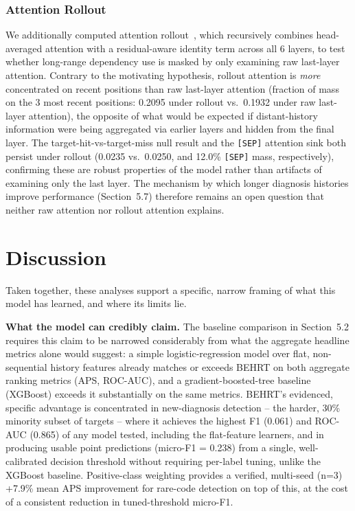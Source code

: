 \documentclass[11pt]{article}
\begin{document}
\subsubsection{Attention Rollout}

We additionally computed attention
rollout~\cite{abnar2020quantifying}, which recursively combines
head-averaged attention with a residual-aware identity term across all 6
layers, to test whether long-range dependency use is masked by only examining
raw last-layer attention. Contrary to the motivating hypothesis, rollout
attention is \emph{more} concentrated on recent positions than raw last-layer
attention (fraction of mass on the 3 most recent positions: 0.2095 under
rollout vs.\ 0.1932 under raw last-layer attention), the opposite of what
would be expected if distant-history information were being aggregated via
earlier layers and hidden from the final layer. The target-hit-vs-target-miss
null result and the \texttt{[SEP]} attention sink both persist under rollout
(0.0235 vs.\ 0.0250, and 12.0\% \texttt{[SEP]} mass, respectively), confirming
these are robust properties of the model rather than artifacts of examining
only the last layer. The mechanism by which longer diagnosis histories
improve performance (Section~5.7) therefore remains an open question that
neither raw attention nor rollout attention explains.

\section{Discussion}

Taken together, these analyses support a specific, narrow framing of what
this model has learned, and where its limits lie.

\textbf{What the model can credibly claim.} The baseline comparison in
Section~5.2 requires this claim to be narrowed considerably from what the
aggregate headline metrics alone would suggest: a simple logistic-regression
model over flat, non-sequential history features already matches or exceeds
BEHRT on both aggregate ranking metrics (APS, ROC-AUC), and a
gradient-boosted-tree baseline (XGBoost) exceeds it substantially on the same
metrics. BEHRT's evidenced, specific advantage is concentrated in
new-diagnosis detection -- the harder, 30\% minority subset of targets --
where it achieves the highest F1 (0.061) and ROC-AUC (0.865) of any model
tested, including the flat-feature learners, and in producing usable point
predictions (micro-F1 = 0.238) from a single, well-calibrated decision
threshold without requiring per-label tuning, unlike the XGBoost baseline.
Positive-class weighting provides a verified, multi-seed (n=3) +7.9\% mean
APS improvement for rare-code detection on top of this, at the cost of a
consistent reduction in tuned-threshold micro-F1.
\end{document}
